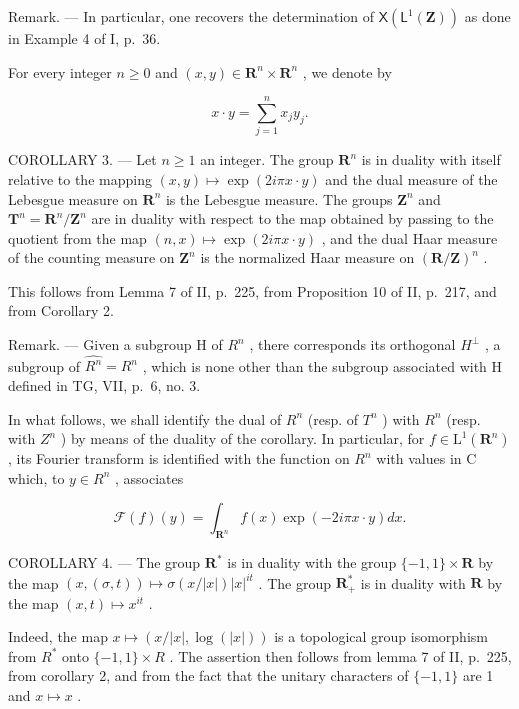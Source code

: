 Remark. --- In particular, one recovers the determination of \(\mathsf{X}(\mathsf{L}^{1}(\mathbf{Z}))\) as done in Example 4 of I, p.~36.

For every integer \(n \geqslant 0\) and \((x, y) \in \mathbf{R}^n \times \mathbf{R}^n\) , we denote by

\[
x \cdot y = \sum_ {j = 1} ^ {n} x _ {j} y _ {j}.
\]

COROLLARY 3. --- Let \(n \geqslant 1\) an integer. The group \(\mathbf{R}^{n}\) is in duality with itself relative to the mapping \((x,y) \mapsto \exp(2i\pi x \cdot y)\) and the dual measure of the Lebesgue measure on \(\mathbf{R}^{n}\) is the Lebesgue measure. The groups \(\mathbf{Z}^{n}\) and \(\mathbf{T}^{n} = \mathbf{R}^{n}/\mathbf{Z}^{n}\) are in duality with respect to the map obtained by passing to the quotient from the map \((n,x) \mapsto \exp(2i\pi x \cdot y)\) , and the dual Haar measure of the counting measure on \(\mathbf{Z}^{n}\) is the normalized Haar measure on \((\mathbf{R}/\mathbf{Z})^{n}\) .

This follows from Lemma 7 of II, p.~225, from Proposition 10 of II, p.~217, and from Corollary 2.

Remark. --- Given a subgroup H of \(R^{n}\) , there corresponds its orthogonal \(H^{\perp}\) , a subgroup of \(\widehat{R^{n}} = R^{n}\) , which is none other than the subgroup associated with H defined in TG, VII, p.~6, no. 3.

In what follows, we shall identify the dual of \(R^{n}\) (resp. of \(T^{n}\) ) with \(R^{n}\) (resp. with \(Z^{n}\) ) by means of the duality of the corollary. In particular, for \(f \in \mathrm{L}^{1}(\mathbf{R}^{n})\) , its Fourier transform is identified with the function on \(R^{n}\) with values in C which, to \(y \in R^{n}\) , associates

\[
\mathcal {F} (f) (y) = \int_ {\mathbf {R} ^ {n}} f (x) \exp (- 2 i \pi x \cdot y) d x.
\]

COROLLARY 4. --- The group \(\mathbf{R}^{*}\) is in duality with the group \(\{-1,1\} \times \mathbf{R}\) by the map \((x,(\sigma,t)) \mapsto \sigma(x/|x|)|x|^{it}\) . The group \(\mathbf{R}_{+}^{*}\) is in duality with \(\mathbf{R}\) by the map \((x,t) \mapsto x^{it}\) .

Indeed, the map \(x \mapsto (x/|x|, \log(|x|))\) is a topological group isomorphism from \(R^{*}\) onto \(\{-1, 1\} \times R\) . The assertion then follows from lemma 7 of II, p.~225, from corollary 2, and from the fact that the unitary characters of \(\{-1, 1\}\) are 1 and \(x \mapsto x\) .

